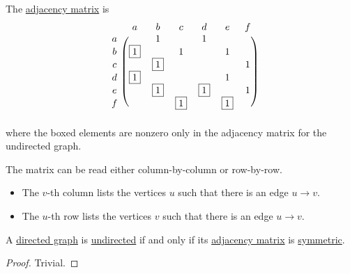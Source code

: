 \begin{example}
  The \hyperref[def:graph_matrices/adjacency]{adjacency matrix} is
  \begin{equation}\label{ex:def:graph_matrices/adjacency}
    \begin{blockarray}{cccccccc}
        & a        & b        & c        & d        & e        & f \\
    \begin{block}{c(ccccccc)}
      a &          & 1        &          & 1        &          &   \\
      b & \fbox{1} &          & 1        &          & 1        &   \\
      c &          & \fbox{1} &          &          &          & 1 \\
      d & \fbox{1} &          &          &          & 1        &   \\
      e &          & \fbox{1} &          & \fbox{1} &          & 1 \\
      f &          &          & \fbox{1} &          & \fbox{1} &   \\
    \end{block}
    \end{blockarray}
  \end{equation}
  where the boxed elements are nonzero only in the adjacency matrix for the undirected graph.

  The matrix can be read either column-by-column or row-by-row.
  \begin{itemize}
    \item The \( v \)-th column lists the vertices \( u \) such that there is an edge \( u \to v \).
    \item The \( u \)-th row lists the vertices \( v \) such that there is an edge \( u \to v \).
  \end{itemize}
\end{example}

\begin{proposition}\label{thm:graph_undirected_iff_adjacency_matrix_is_symmetric}
  A \hyperref[def:graph/directed]{directed graph} is \hyperref[def:graph/directed]{undirected} if and only if its \hyperref[def:graph_matrices/adjacency]{adjacency matrix} is \hyperref[def:symmetric_matrix]{symmetric}.
\end{proposition}
\begin{proof}
  Trivial.
\end{proof}

